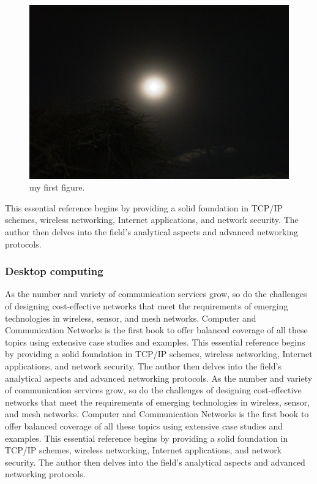 \begin{figure}
    \centering
    \includegraphics[scale=0.1]{history/history.jpg}
    \caption{my first figure.}
    \label{fig:yared}
\end{figure}
This essential reference begins by providing a solid foundation in TCP/IP schemes, wireless networking, Internet applications, and network security. The author then delves into the field's analytical aspects and advanced networking protocols.

        \subsubsection{Desktop computing}
        As the number and variety of communication services grow, so do the challenges of designing cost-effective networks that meet the requirements of emerging technologies in wireless, sensor, and mesh networks. Computer and Communication Networks is the first book to offer balanced coverage of all these topics using extensive case studies and examples.
This essential reference begins by providing a solid foundation in TCP/IP schemes, wireless networking, Internet applications, and network security. The author then delves into the field's analytical aspects and advanced networking protocols.
As the number and variety of communication services grow, so do the challenges of designing cost-effective networks that meet the requirements of emerging technologies in wireless, sensor, and mesh networks. Computer and Communication Networks is the first book to offer balanced coverage of all these topics using extensive case studies and examples.
This essential reference begins by providing a solid foundation in TCP/IP schemes, wireless networking, Internet applications, and network security. The author then delves into the field's analytical aspects and advanced networking protocols.
